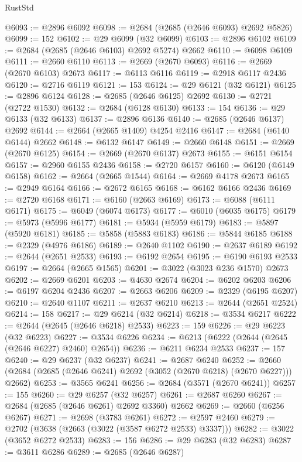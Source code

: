 \begin{lexlean}{RustStd}
\begin{coremodule}
@6093 := @2896 @6092
@6098 := @2684 (@2685 (@2646 @6093) @2692 @5826)
@6099 := 152
@6102 := @29 @6099 (@32 @6099)
@6103 := @2896 @6102
@6109 := @2684 (@2685 (@2646 @6103) @2692 @5274) @2662
@6110 := @6098 @6109
@6111 := @2660 @6110
@6113 := @2669 (@2670 @6093)
@6116 := @2669 (@2670 @6103) @2673
@6117 := @6113 @6116
@6119 := @2918 @6117 @2436
@6120 := @2716 @6119
@6121 := 153
@6124 := @29 @6121 (@32 @6121)
@6125 := @2896 @6124
@6128 := @2685 (@2646 @6125) @2692
@6130 := @2721 (@2722 @1530)
@6132 := @2684 (@6128 @6130)
@6133 := 154
@6136 := @29 @6133 (@32 @6133)
@6137 := @2896 @6136
@6140 := @2685 (@2646 @6137) @2692
@6144 := @2664 (@2665 @1409) @4254 @2416
@6147 := @2684 (@6140 @6144) @2662
@6148 := @6132 @6147
@6149 := @2660 @6148
@6151 := @2669 (@2670 @6125)
@6154 := @2669 (@2670 @6137) @2673
@6155 := @6151 @6154
@6157 := @2960 @6155 @2436
@6158 := @2720 @6157
@6160 := @6120 (@6149 @6158)
@6162 := @2664 (@2665 @1544)
@6164 := @2669 @4178 @2673
@6165 := @2949 @6164
@6166 := @2672 @6165
@6168 := @6162 @6166 @2436
@6169 := @2720 @6168
@6171 := @6160 (@2663 @6169)
@6173 := @6088 (@6111 @6171)
@6175 := @6049 (@6074 @6173)
@6177 := @6010 (@6035 @6175)
@6179 := @5973 (@5996 @6177)
@6181 := @5934 (@5959 @6179)
@6183 := @5897 (@5920 @6181)
@6185 := @5858 (@5883 @6183)
@6186 := @5844 @6185
@6188 := @2329 (@4976 @6186)
@6189 := @2640 @1102
@6190 := @2637 @6189
@6192 := @2644 (@2651 @2533)
@6193 := @6192 @2654
@6195 := @6190 @6193 @2533
@6197 := @2664 (@2665 @1565)
@6201 := @3022 (@3023 @236 @1570) @2673
@6202 := @2669 @6201
@6203 := @4630 @2674
@6204 := @6202 @6203
@6206 := @6197 @6204 @2436
@6207 := @2663 @6206
@6209 := @2329 (@6195 @6207)
@6210 := @2640 @1107
@6211 := @2637 @6210
@6213 := @2644 (@2651 @2524)
@6214 := 158
@6217 := @29 @6214 (@32 @6214)
@6218 := @3534 @6217
@6222 := @2644 (@2645 (@2646 @6218) @2533)
@6223 := 159
@6226 := @29 @6223 (@32 @6223)
@6227 := @3534 @6226
@6234 := @6213 (@6222 (@2644 (@2645 (@2646 @6227) @2460) @2654))
@6236 := @6211 @6234 @2533
@6237 := 157
@6240 := @29 @6237 (@32 @6237)
@6241 := @2687 @6240
@6252 := @2660 (@2684 (@2685 (@2646 @6241) @2692 (@3052 (@2670 @6218) (@2670 @6227))) @2662)
@6253 := @3565 @6241
@6256 := @2684 (@3571 (@2670 @6241))
@6257 := 155
@6260 := @29 @6257 (@32 @6257)
@6261 := @2687 @6260
@6267 := @2684 (@2685 (@2646 @6261) @2692 @3360) @2662
@6269 := @2660 (@6256 @6267)
@6271 := @2698 (@3783 @6261)
@6272 := @2597 @2460
@6279 := @2702 (@3638 (@2663 (@3022 (@3587 @6272 @2533) @3337)))
@6282 := @3022 (@3652 @6272 @2533)
@6283 := 156
@6286 := @29 @6283 (@32 @6283)
@6287 := @3611 @6286
@6289 := @2685 (@2646 @6287)

\end{coremodule}
\end{lexlean}
